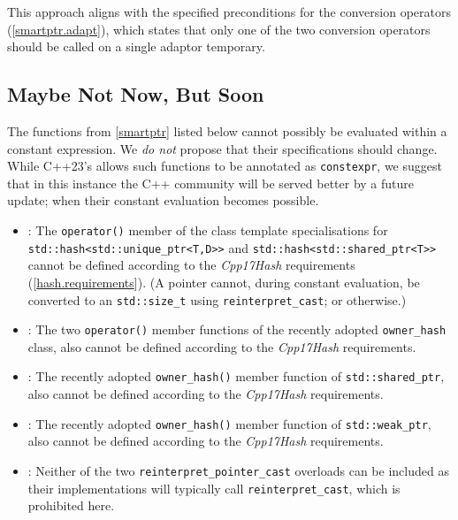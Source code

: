 \documentclass[10pt]{article}
\newcommand*{\wgxxi}[1]{[\href{https://wg21.link/#1}{#1}]}
\begin{document}
This approach aligns with the specified preconditions for the conversion
operators (\wgxxi{smartptr.adapt}), which states that only one of the two
conversion operators should be called on a single adaptor temporary.

\subsection{Maybe Not Now, But Soon}
\label{sec:mnnbs}

The functions from \wgxxi{smartptr} listed below cannot possibly be evaluated
within a constant expression. We \emph{do not} propose that their
specifications should change. While C++23's \cite{P2448R2} allows such
functions to be annotated as \texttt{constexpr}, we suggest that in this
instance the C++ community will be served better by a future update; when their
constant evaluation becomes possible.

\begin{itemize}
  \item \wgxxi{util.smartptr.hash}: The \texttt{operator()} member of the class template specialisations for \linebreak \texttt{std::hash<std::unique\_ptr<T,D>>} and \texttt{std::hash<std::shared\_ptr<T>>} cannot be defined according to the \emph{Cpp17Hash} requirements (\wgxxi{hash.requirements}). (A pointer cannot, during constant evaluation, be converted to an \texttt{std::size\_t} using \texttt{reinterpret\_cast}; or otherwise.)

  \item \wgxxi{util.smartptr.owner.hash}: The two \texttt{operator()} member functions of the recently adopted \texttt{owner\_hash} class, also cannot be defined according to the \emph{Cpp17Hash} requirements.

  \item \wgxxi{util.smartptr.shared.obs}: The recently adopted \texttt{owner\_hash()} member function of \texttt{std::shared\_ptr}, also cannot be defined according to the \emph{Cpp17Hash} requirements.

  \item \wgxxi{util.smartptr.weak.obs}: The recently adopted \texttt{owner\_hash()} member function of \texttt{std::weak\_ptr}, also cannot be defined according to the \emph{Cpp17Hash} requirements.

  \item \wgxxi{util.smartptr.shared.cast}: Neither of the two \texttt{reinterpret\_pointer\_cast} overloads can be included as their implementations will typically call \texttt{reinterpret\_cast}, which is prohibited here.

\end{itemize}
\end{document}
